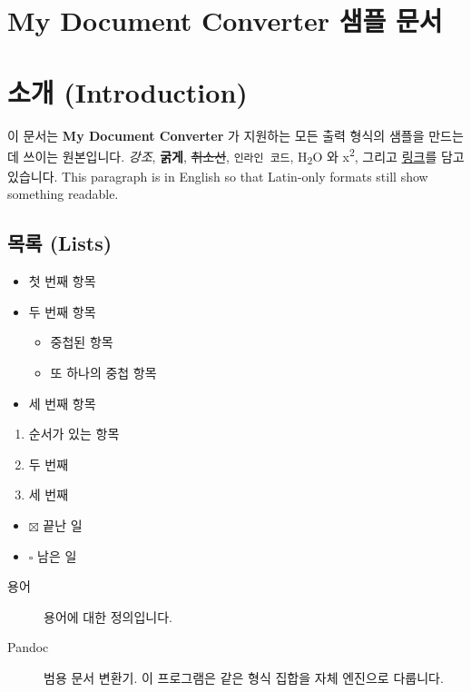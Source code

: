 \documentclass[11pt]{article}
\date{}
\begin{document}
\section*{My Document Converter 샘플 문서}\label{my-document-converter-샘플-문서}

\section*{소개 (Introduction)}\label{소개-introduction}

이 문서는 \textbf{My Document Converter} 가 지원하는 모든 출력 형식의 샘플을 만드는 데 쓰이는
원본입니다.
\emph{강조}, \textbf{굵게}, \sout{취소선}, \verb|인라인 코드|, H\textsubscript{2}O 와
x\textsuperscript{2}, 그리고
\href{https://example.com}{링크}를 담고 있습니다. This paragraph is in English so
that
Latin-only formats still show something readable.

\subsection*{목록 (Lists)}\label{목록-lists}

\begin{itemize}
\item 첫 번째 항목
\item 두 번째 항목
\begin{itemize}
\item 중첩된 항목
\item 또 하나의 중첩 항목
\end{itemize}
\item 세 번째 항목
\end{itemize}

\begin{enumerate}
\item 순서가 있는 항목
\item 두 번째
\item 세 번째
\end{enumerate}

\begin{itemize}
\item $\boxtimes$ 끝난 일
\item $\square$ 남은 일
\end{itemize}

\begin{description}
\item[용어] 용어에 대한 정의입니다.
\item[Pandoc] 범용 문서 변환기. 이 프로그램은 같은 형식 집합을 자체 엔진으로 다룹니다.
\end{description}
\end{document}
